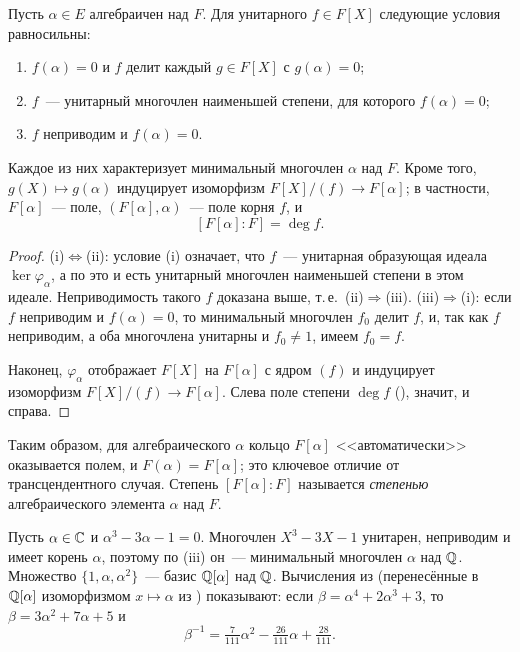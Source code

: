 \begin{proposition}[1.27c]
Пусть $\alpha\in E$ алгебраичен над $F$. Для унитарного $f\in F[X]$ следующие условия равносильны:
\begin{enumerate}[label=(\roman*),leftmargin=*]
\item $f(\alpha)=0$ и $f$ делит каждый $g\in F[X]$ с $g(\alpha)=0$;
\item $f$~--- унитарный многочлен наименьшей степени, для которого $f(\alpha)=0$;
\item $f$ неприводим и $f(\alpha)=0$.
\end{enumerate}
Каждое из них характеризует минимальный многочлен $\alpha$ над $F$. Кроме того, $g(X)\mapsto g(\alpha)$ индуцирует
изоморфизм $F[X]/(f)\to F[\alpha]$; в частности, $F[\alpha]$~--- поле, $(F[\alpha],\alpha)$~--- поле корня $f$, и
\[
[F[\alpha]:F]=\deg f.
\]
\end{proposition}

\begin{proof}
(i)$\Leftrightarrow$(ii): условие (i) означает, что $f$~--- унитарная образующая идеала $\ker\varphi_\alpha$, а по 
это и есть унитарный многочлен наименьшей степени в этом идеале. Неприводимость такого $f$ доказана выше, т.\,е.\ (ii)$\Rightarrow$(iii).
(iii)$\Rightarrow$(i): если $f$ неприводим и $f(\alpha)=0$, то минимальный многочлен $f_0$ делит $f$, и, так как $f$
неприводим, а оба многочлена унитарны и $f_0\ne1$, имеем $f_0=f$.

Наконец, $\varphi_\alpha$ отображает $F[X]$ на $F[\alpha]$ с ядром $(f)$ и индуцирует изоморфизм $F[X]/(f)\to F[\alpha]$.
Слева поле степени $\deg f$ (), значит, и справа.
\end{proof}

Таким образом, для алгебраического $\alpha$ кольцо $F[\alpha]$ <<автоматически>> оказывается полем, и
$F(\alpha)=F[\alpha]$; это ключевое отличие от трансцендентного случая. Степень $[F[\alpha]:F]$ называется
\emph{степенью} алгебраического элемента $\alpha$ над $F$.

\begin{example}[1.28]
Пусть $\alpha\in\mathbb C$ и $\alpha^3-3\alpha-1=0$. Многочлен $X^3-3X-1$ унитарен, неприводим и имеет корень $\alpha$, поэтому
по (iii) он~--- минимальный многочлен $\alpha$ над $\mathbb Q$. Множество $\{1,\alpha,\alpha^2\}$~--- базис $\mathbb Q[\alpha]$
над $\mathbb Q$. Вычисления из  (перенесённые в $\mathbb Q[\alpha]$ изоморфизмом $x\mapsto\alpha$ из ) показывают:
если $\beta=\alpha^4+2\alpha^3+3$, то $\beta=3\alpha^2+7\alpha+5$ и
\[
\beta^{-1}=\tfrac{7}{111}\alpha^2-\tfrac{26}{111}\alpha+\tfrac{28}{111}.
\]
\end{example}


